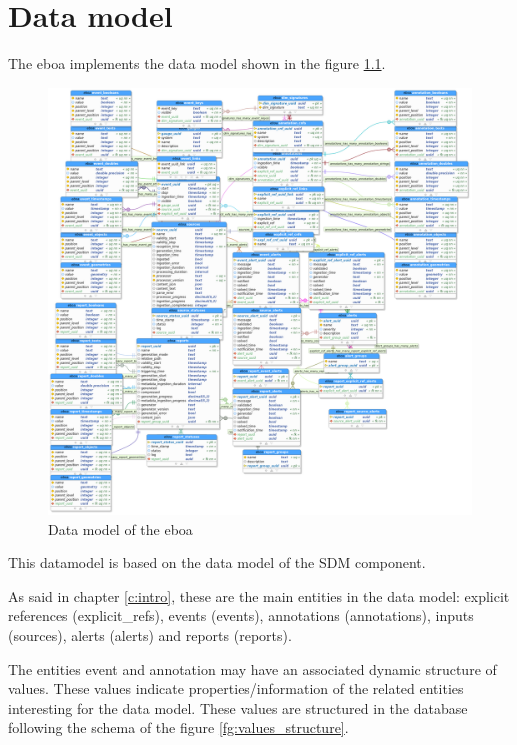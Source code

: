 \chapter{Data model}

The \acrshort{eboa} implements the data model shown in the figure \ref{fg:eboadb}.

\begin{figure}[H]
  \begin{center}
	\centering\includegraphics[width=150mm]{../fig/eboadb.png}
	\caption{Data model of the \acrshort{eboa}}
	\label{fg:eboadb}
  \end{center}
\end{figure}

This datamodel is based on the data model of the SDM component.

As said in chapter \ref{c:intro}, these are the main entities in the data model: explicit references (explicit\_refs), events (events), annotations (annotations), inputs (sources), alerts (alerts) and reports (reports).

The entities event and annotation may have an associated dynamic structure of values. These values indicate properties/information of the related entities interesting for the data model. These values are structured in the database following the schema of the figure \ref{fg:values_structure}.

